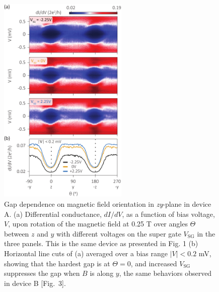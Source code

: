 \begin{figure}[p!]
\centering
\includegraphics[width=0.55\textwidth]{figures/SFig4_YZrot_Full1_reproduced.pdf}
\caption{\label{fig:YZrotRep}
Gap dependence on magnetic field orientation in \textit{zy}-plane in device A.
(a) Differential conductance, $dI/dV$, as a function of bias voltage, $V$, upon rotation of the magnetic field at 0.25 T over angles $\Theta$ between $z$ and $y$ with different voltages on the super gate $V_{\mathrm{SG}}$ in the three panels.
This is the same device as presented in Fig.
1 (b) Horizontal line cuts of (a) averaged over a bias range $|V| < 0.2$ mV, showing that the hardest gap is at $\Theta = 0$, and increased $V_{\mathrm{SG}}$ suppresses the gap when $B$ is along $y$, the same behaviors observed in device B [Fig.~3].
}
\end{figure}


